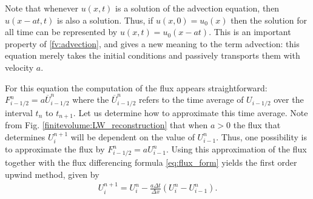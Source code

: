 Note that whenever $u(x,t)$ is a solution of the advection equation, then $u(x-at,t)$ is also a solution.  Thus, if $u(x,0) = u_0(x)$ then the solution for all time can be represented by $u(x,t) = u_0(x-at)$.  This is an important property of \eqref{fv:advection}, and gives a new meaning to the term advection: this equation merely takes the initial conditions and passively transports them with velocity $a$.

For this equation the computation of the flux appears straightforward: $F_{i-1/2}^n = a\overline{U}^n_{i-1/2}$ where the $\overline{U}^n_{i-1/2}$ refers to the time average of $U_{i-1/2}$ over the interval $t_n$ to $t_{n+1}$.  Let us determine how to approximate this time average.  
Note from Fig. \ref{finitevolume:LW_reconstruction} that when $a>0$ the flux that determines $U_i^{n+1}$ will be dependent on the value of $U_{i-1}^n$. Thus, one possibility is to approximate the flux by $F_{i-1/2}^n = aU_{i-1}^n$.
Using this approximation of the flux together with the flux differencing formula \eqref{eq:flux_form} yields the first order upwind method, given by 
\begin{align*}
U_i^{n+1} = U_i^n - \frac{a\Delta t}{\Delta x}\left(U_i^n-U_{i-1}^n\right).
\end{align*} 

